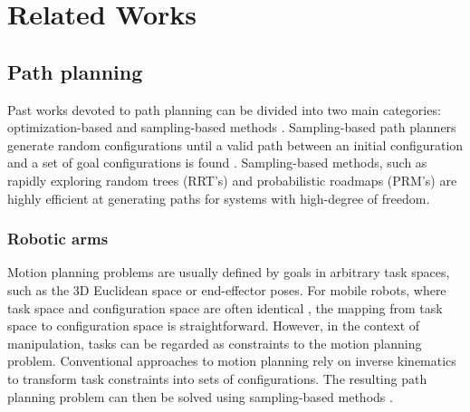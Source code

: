 \chapter{Related Works} %
\label{cha:related_works}





\newpage



\section{Path planning}
\label{sec:path_planning}

Past works devoted to path planning can be divided into two
main categories: optimization-based and sampling-based
methods \cite{LaValle2006,Mukadam2017}. Sampling-based path
planners generate random configurations until a valid path
between an initial configuration and a set of goal
configurations is found \cite{Karaman2011}. Sampling-based
methods, such as rapidly exploring random trees (RRT's)
\cite{Webb2013,Kleinbort2019,Kuffner2000} and probabilistic
roadmaps (PRM's) \cite{Hsu2002,Faust2017} are highly
efficient at generating paths for systems with high-degree
of freedom.

\subsection{Robotic arms}%
\label{sub:robotic_arms}

Motion planning problems are usually defined by goals in
arbitrary task spaces, such as the 3D Euclidean space or
end-effector poses. For mobile robots, where task space and
configuration space are often identical \cite{LaValle2006},
the mapping from task space to configuration space is
straightforward. However, in the context of manipulation,
tasks can be regarded as constraints to the motion planning
problem. Conventional approaches to motion planning rely on
inverse kinematics to transform task constraints into sets
of configurations. The resulting path planning problem can
then be solved using sampling-based methods
\cite{Rickert2014}.

